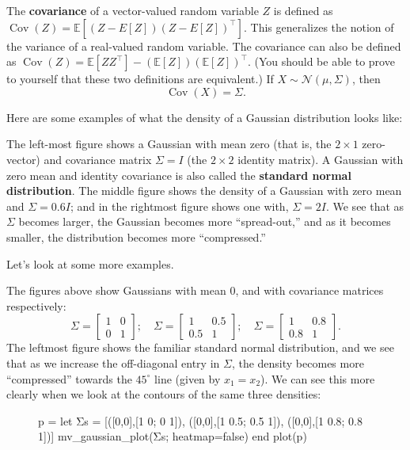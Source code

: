 The \textbf{covariance} of a vector-valued random variable $Z$ is defined as $\operatorname{Cov}(Z) =
\mathbb E[(Z - E[Z])(Z - E[Z])^\top]$. This generalizes the notion of the variance of a
real-valued random variable. The covariance can also be defined as $\operatorname{Cov}(Z) =
\mathbb E[Z Z^\top] - (\mathbb E[Z])(\mathbb E[Z])^\top$. (You should be able to prove to yourself that these
two definitions are equivalent.) If $X \sim \mathcal N(\mu,\Sigma)$, then
\begin{equation}
    \operatorname{Cov}(X) = \Sigma.
\end{equation}

Here are some examples of what the density of a Gaussian distribution
looks like:

The left-most figure shows a Gaussian with mean zero (that is, the $2\times1$
zero-vector) and covariance matrix $\Sigma = I$ (the $2\times2$ identity matrix). A
Gaussian with zero mean and identity covariance is also called the \textbf{standard normal
distribution}. The middle figure shows the density of a Gaussian with
zero mean and $\Sigma = 0.6I$; and in the rightmost figure shows one with, $\Sigma = 2I$.
We see that as $\Sigma$ becomes larger, the Gaussian becomes more ``spread-out,''
and as it becomes smaller, the distribution becomes more ``compressed.''

Let's look at some more examples.

The figures above show Gaussians with mean $0$, and with covariance
matrices respectively:
\begin{equation}
    \Sigma = \begin{bmatrix}
    1 & 0\\
    0 & 1
    \end{bmatrix};\quad
    \Sigma = \begin{bmatrix}
    1 & 0.5\\
    0.5 & 1
    \end{bmatrix};\quad
    \Sigma = \begin{bmatrix}
    1 & 0.8\\
    0.8 & 1
    \end{bmatrix}.
\end{equation}
The leftmost figure shows the familiar standard normal distribution, and we
see that as we increase the off-diagonal entry in $\Sigma$, the density becomes more
``compressed'' towards the $45^\circ$ line (given by $x_1 = x_2$). We can see this more
clearly when we look at the contours of the same three densities:
\begin{figure}
    \begin{jlcode}
    p = let
        Σs = [([0,0],[1 0; 0 1]),
              ([0,0],[1 0.5; 0.5 1]),
              ([0,0],[1 0.8; 0.8 1])]
        mv_gaussian_plot(Σs; heatmap=false)
    end
    plot(p)
    \end{jlcode}
    \begin{center}
    \end{center}
\end{figure}


